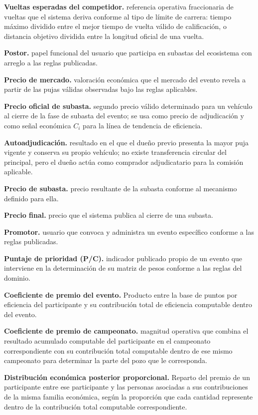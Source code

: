 \documentclass[10pt,letterpaper]{article}
\begin{document}
\noindent\textbf{Vueltas esperadas del competidor.} referencia operativa fraccionaria de vueltas que el sistema deriva conforme al tipo de límite de carrera: tiempo máximo dividido entre el mejor tiempo de vuelta válido de calificación, o distancia objetivo dividida entre la longitud oficial de una vuelta.\par
\noindent\textbf{Postor.} papel funcional del usuario que participa en subastas del ecosistema con arreglo a las reglas publicadas.\par
\noindent\textbf{Precio de mercado.} valoración económica que el mercado del evento revela a partir de las pujas válidas observadas bajo las reglas aplicables.\par
\noindent\textbf{Precio oficial de subasta.} segundo precio válido determinado para un vehículo al cierre de la fase de subasta del evento; se usa como precio de adjudicación y como señal económica $C_i$ para la línea de tendencia de eficiencia.\par
\noindent\textbf{Autoadjudicación.} resultado en el que el dueño previo presenta la mayor puja vigente y conserva su propio vehículo; no existe transferencia circular del principal, pero el dueño actúa como comprador adjudicatario para la comisión aplicable.\par
\noindent\textbf{Precio de subasta.} precio resultante de la subasta conforme al mecanismo definido para ella.\par
\noindent\textbf{Precio final.} precio que el sistema publica al cierre de una subasta.\par
\noindent\textbf{Promotor.} usuario que convoca y administra un evento específico conforme a las reglas publicadas.\par
\noindent\textbf{Puntaje de prioridad (P/C).} indicador publicado propio de un evento que interviene en la determinación de su matriz de pesos conforme a las reglas del dominio.\par
\noindent\textbf{Coeficiente de premio del evento.} Producto entre la base de puntos por eficiencia del participante y su contribución total de eficiencia computable dentro del evento.\par
\noindent\textbf{Coeficiente de premio de campeonato.} magnitud operativa que combina el resultado acumulado computable del participante en el campeonato correspondiente con su contribución total computable dentro de ese mismo campeonato para determinar la parte del pozo que le corresponda.\par
\noindent\textbf{Distribución económica posterior proporcional.} Reparto del premio de un participante entre ese participante y las personas asociadas a sus contribuciones de la misma familia económica, según la proporción que cada cantidad represente dentro de la contribución total computable correspondiente.\par
\end{document}
